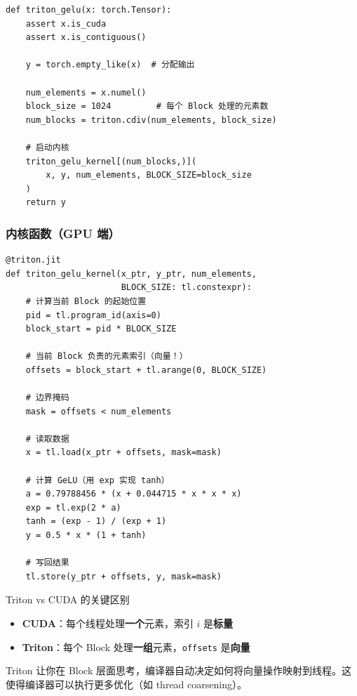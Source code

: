 \documentclass[a4paper]{article}
\begin{document}
\begin{lstlisting}[caption={Triton GeLU 包装器}]
def triton_gelu(x: torch.Tensor):
    assert x.is_cuda
    assert x.is_contiguous()

    y = torch.empty_like(x)  # 分配输出

    num_elements = x.numel()
    block_size = 1024         # 每个 Block 处理的元素数
    num_blocks = triton.cdiv(num_elements, block_size)

    # 启动内核
    triton_gelu_kernel[(num_blocks,)](
        x, y, num_elements, BLOCK_SIZE=block_size
    )
    return y
\end{lstlisting}

\subsubsection{内核函数（GPU 端）}

\begin{lstlisting}[caption={Triton GeLU 内核}]
@triton.jit
def triton_gelu_kernel(x_ptr, y_ptr, num_elements,
                       BLOCK_SIZE: tl.constexpr):
    # 计算当前 Block 的起始位置
    pid = tl.program_id(axis=0)
    block_start = pid * BLOCK_SIZE

    # 当前 Block 负责的元素索引（向量！）
    offsets = block_start + tl.arange(0, BLOCK_SIZE)

    # 边界掩码
    mask = offsets < num_elements

    # 读取数据
    x = tl.load(x_ptr + offsets, mask=mask)

    # 计算 GeLU（用 exp 实现 tanh）
    a = 0.79788456 * (x + 0.044715 * x * x * x)
    exp = tl.exp(2 * a)
    tanh = (exp - 1) / (exp + 1)
    y = 0.5 * x * (1 + tanh)

    # 写回结果
    tl.store(y_ptr + offsets, y, mask=mask)
\end{lstlisting}

\begin{importantbox}{Triton vs CUDA 的关键区别}
\begin{itemize}
    \item \textbf{CUDA}：每个线程处理\textbf{一个}元素，索引 $i$ 是\textbf{标量}
    \item \textbf{Triton}：每个 Block 处理\textbf{一组}元素，\texttt{offsets} 是\textbf{向量}
\end{itemize}
Triton 让你在 Block 层面思考，编译器自动决定如何将向量操作映射到线程。这使得编译器可以执行更多优化（如 thread coarsening）。
\end{importantbox}
\end{document}
